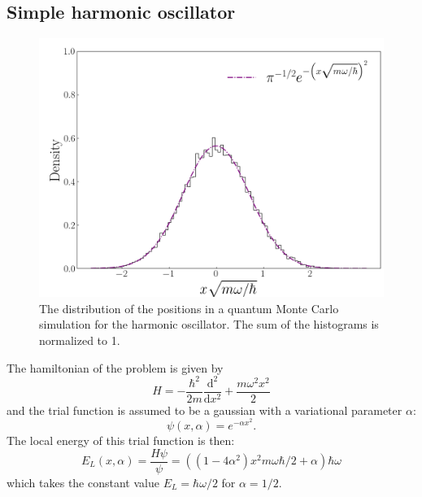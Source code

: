 \documentclass[twocolumn]{article}
\begin{document}
\begin{large}
\subsection*{Simple harmonic oscillator}
\begin{figure}[!b]
    \includegraphics[scale=0.35]{DensityHarOsc.png}
    \caption{The distribution of the positions in a quantum Monte Carlo simulation for the harmonic oscillator. The sum of the histograms is normalized to 1.}
    \label{11apr0918}
\end{figure}
The hamiltonian of the problem is given by
\begin{equation}
    H = -\frac{\hbar^2}{2m}\frac{\text{d}^2}{\text{d}x^2} + \frac{m\omega^2x^2}{2}
\end{equation}
and the trial function is assumed to be a gaussian with a variational parameter $\alpha$:
\begin{equation}
    \psi(x,\alpha) = e^{-\alpha x^2}.
\end{equation}
The local energy of this trial function is then:
\begin{equation}
    E_L(x,\alpha) =\frac{H\psi}{\psi} = \left(\left(1-4\alpha^2\right)x^2m\omega\hbar/2 + \alpha\right)\hbar\omega
\end{equation}
which takes the constant value $E_L=\hbar\omega/2$ for $\alpha = 1/2$. 


\end{large}
\end{document}
